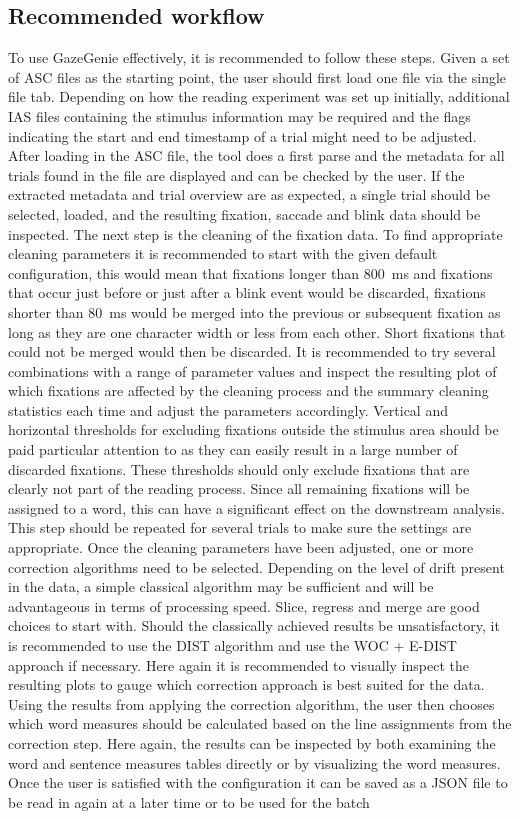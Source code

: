 \documentclass[twocolumn]{article}
\begin{document}
\subsection{Recommended workflow}
\label{sec:rec_flow}
To use GazeGenie effectively, it is recommended to follow these steps. Given a set of ASC files as the starting point, the user should first load one file via the single file tab. Depending on how the reading experiment was set up initially, additional IAS files containing the stimulus information may be required and the flags indicating the start and end timestamp of a trial might need to be adjusted. After loading in the ASC file, the tool does a first parse and the metadata for all trials found in the file are displayed and can be checked by the user. If the extracted metadata and trial overview are as expected, a single trial should be selected, loaded, and the resulting fixation, saccade and blink data should be inspected. The next step is the cleaning of the fixation data. To find appropriate cleaning parameters it is recommended to start with the given default configuration, this would mean that fixations longer than 800~ms and fixations that occur just before or just after a blink event would be discarded, fixations shorter than 80~ms would be merged into the previous or subsequent fixation as long as they are one character width or less from each other. Short fixations that could not be merged would then be discarded. It is recommended to try several combinations with a range of parameter values and inspect the resulting plot of which fixations are affected by the cleaning process and the summary cleaning statistics each time and adjust the parameters accordingly. Vertical and horizontal thresholds for excluding fixations outside the stimulus area should be paid particular attention to as they can easily result in a large number of discarded fixations. These thresholds should only exclude fixations that are clearly not part of the reading process. Since all remaining fixations will be assigned to a word, this can have a significant effect on the downstream analysis. This step should be repeated for several trials to make sure the settings are appropriate. Once the cleaning parameters have been adjusted, one or more correction algorithms need to be selected. Depending on the level of drift present in the data, a simple classical algorithm may be sufficient and will be advantageous in terms of processing speed. Slice, regress and merge are good choices to start with. Should the classically achieved results be unsatisfactory, it is recommended to use the DIST algorithm and use the WOC + E-DIST approach if necessary. Here again it is recommended to visually inspect the resulting plots to gauge which correction approach is best suited for the data. Using the results from applying the correction algorithm, the user then chooses which word measures should be calculated based on the line assignments from the correction step. Here again, the results can be inspected by both examining the word and sentence measures tables directly or by visualizing the word measures. Once the user is satisfied with the configuration it can be saved as a JSON file to be read in again at a later time or to be used for the batch 
\end{document}
